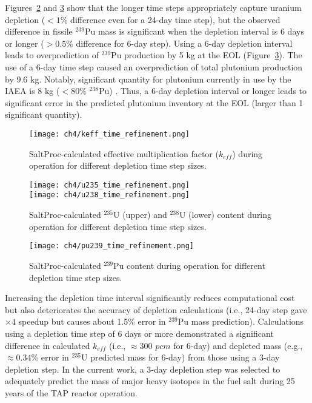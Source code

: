 Figures~\ref{fig:timeref-u} and \ref{fig:timeref-pu239} show that the longer 
time steps appropriately capture uranium depletion ($<1$\% difference even for 
a 24-day time step), but the observed difference in fissile $^{239}$Pu mass is 
significant when the depletion interval is 6 days or longer ($>0.5$\% 
difference for 6-day step). Using a 6-day depletion interval leads to 
overprediction of $^{239}$Pu production by 5 kg at the \gls{EOL} 
(Figure~\ref{fig:timeref-pu239}). The use of a 6-day time step caused an 
overprediction of total plutonium production by 9.6 kg. Notably, 
significant quantity for plutonium currently in use by the IAEA is 8 kg 
($<80$\% $^{238}$Pu) \cite{close_iaea_1995}. Thus, a 6-day depletion interval 
or longer leads to significant error in the predicted plutonium inventory at 
the \gls{EOL} (larger than 1 significant quantity). 
\begin{figure}[hbp!] %
	\centering
	\texttt{[image: ch4/keff\_time\_refinement.png]}
	\caption{SaltProc-calculated effective multiplication factor ($k_{eff}$) 
	during operation for different depletion time step sizes.}
	\label{fig:timeref-keff}
\end{figure}

\begin{figure}[hbp!] %
	\centering
	\texttt{[image: ch4/u235\_time\_refinement.png]}\\
		\vspace{-11mm}
	\hspace{0.5mm}
	\texttt{[image: ch4/u238\_time\_refinement.png]}
		\vspace{-6mm}
	\caption{SaltProc-calculated $^{235}$U (upper) and $^{238}$U (lower) 
	content during operation for different depletion time step sizes.}
	\label{fig:timeref-u}
\end{figure}

\begin{figure}[htp!] %
	\centering
	\texttt{[image: ch4/pu239\_time\_refinement.png]}
	\caption{SaltProc-calculated $^{239}$Pu content during operation for 
		different depletion time step sizes.}
	\label{fig:timeref-pu239}
\end{figure}
Increasing the depletion time interval significantly reduces computational 
cost but also deteriorates the accuracy of depletion calculations (i.e., 
24-day step gave $\times4$ speedup but causes about 1.5\% error in $^{239}$Pu 
mass prediction). Calculations using a depletion time step of 6 days or more 
demonstrated a significant difference in calculated $k_{eff}$ (i.e., 
$\approx300$ $pcm$ for 6-day) and depleted 
mass (e.g., $\approx0.34$\% error in $^{235}$U predicted mass for 6-day) from 
those using a 3-day depletion step. In the current work, a 3-day 
depletion step was selected to adequately predict the mass of major heavy 
isotopes in the fuel salt during 25 years of the \gls{TAP} reactor operation.


